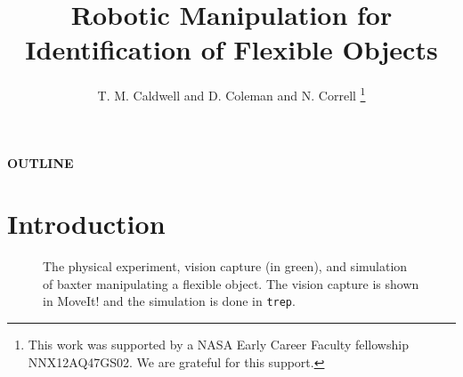 \documentclass[runningheads,a4paper]{llncs}
\begin{document}
\mainmatter  %

\title{Robotic Manipulation for Identification of Flexible Objects}



\author{T. M. Caldwell and  D. Coleman and N. Correll%
\thanks{
This work was supported by a NASA
Early Career Faculty fellowship NNX12AQ47GS02. We are grateful for this support.}%
}
%


\maketitle

{\centering \textbf{OUTLINE} }

\section{Introduction}

\begin{figure}[!htb]
\centering
\def\svgwidth{.95\textwidth}%

\caption{The physical experiment, vision capture (in green), and simulation of baxter manipulating a flexible object. The vision capture is shown in MoveIt! and the simulation is done in \texttt{trep}.}
\label{fig-baxter_y}
\end{figure}
\end{document}
